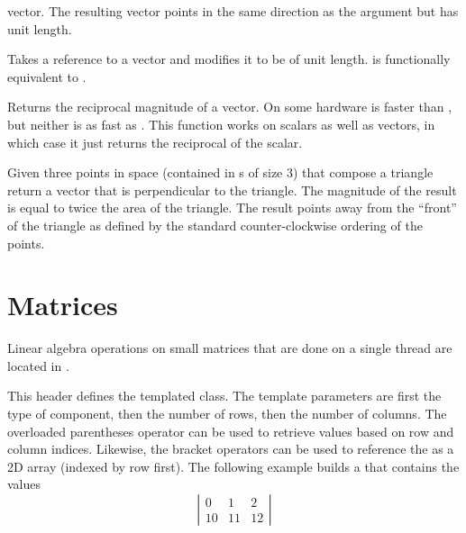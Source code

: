 \begin{description}
  vector. The resulting vector points in the same direction as the argument
  but has unit length.
\item[\vtkm{Normalize}] Takes a reference to a vector and modifies it to
  be of unit length.  is
  functionally equivalent to
  .
\item[\vtkm{RMagnitude}] Returns the reciprocal magnitude of a
  vector. On some hardware  is faster than
  , but neither is as fast as
  . This function works on scalars as well
  as vectors, in which case it just returns the reciprocal of the scalar.
\item[\vtkm{TriangleNormal}] Given three points in space (contained in
  s of size 3) that compose a triangle return a vector that is
  perpendicular to the triangle. The magnitude of the result is equal to
  twice the area of the triangle. The result points away from the ``front''
  of the triangle as defined by the standard counter-clockwise ordering of
  the points.
\end{description}


\section{Matrices}
\label{sec:Math:Matrices}


Linear algebra operations on small matrices that are done on a single
thread are located in .

This header defines the  templated class. The template
parameters are first the type of component, then the number of rows, then
the number of columns. The overloaded parentheses operator can be used to
retrieve values based on row and column indices. Likewise, the bracket
operators can be used to reference the  as a 2D
array (indexed by row first). The following example builds a
 that contains the values
\begin{equation*}
  \left|
  \begin{array}{ccc}
    0 & 1 & 2 \\
    10 & 11 & 12
  \end{array}
  \right|
\end{equation*}

